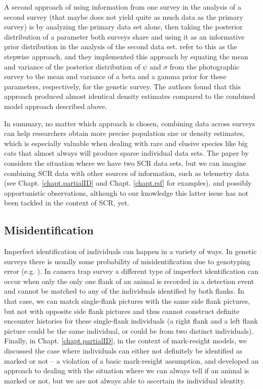 A second approach of using information from one survey in the analysis
of a second survey (that maybe does not yield quite as much data as
the primary survey) is by analyzing the 
primary data set alone, then
taking the posterior distribution of a parameter both surveys share
and using it as an informative prior distribution in the analysis of
the second data set. \citet{gopalaswamy_etal:2012mee} refer to this as
the stepwise approach, and they implemented this approach by equating
the mean and variance of the posterior distribution of $\psi$ and
$\sigma$ from the photographic survey to the mean and variance of a
beta and a gamma prior for these parameters, respectively, for the
genetic survey. The authors found that this approach produced almost
identical density estimates compared to the combined model approach
described above.

In summary, no matter which approach is chosen, combining data across
surveys can help researchers 
obtain more precise population size or density estimates, which is
especially valuable when dealing with rare and elusive species like
big cats that almost always will produce sparse individual data sets.
The paper by \citet{gopalaswamy_etal:2012mee} considers the situation
where we have two SCR data sets, but we can imagine combining SCR data
with other sources of information, such as telemetry data (see
Chapt. \ref{chapt.partialID} and Chapt. \ref{chapt.rsf} for examples),
and possibly opportunistic observations, although to our knowledge
this latter issue has not been tackled in the context of SCR, yet.


\subsection{Misidentification}

Imperfect identification of individuals can happen in a variety of
ways. In genetic surveys there is usually some probability of
misidentification due to genotyping error
(e.g. \citet{lukacs_burnham:2005}). In camera trap survey a different
type of imperfect identification can occur when only the only one
flank of an animal is recorded in a detection event and cannot be
matched to any of the individuals identified by both flanks.
In that case, we can match single-flank pictures with the same side
flank pictures, but not with opposite side flank pictures and thus
cannot construct definite encounter histories for these single-flank
individuals (a right flank and a left flank picture could be the same
individual, or could be from two distinct individuals). Finally, in
Chapt. \ref{chapt.partialID}, in the context of mark-resight models,
we discussed the case where individuals can either not definitely be
identified as marked or not -- a violation of a basic mark-resight
assumption, and developed an approach to dealing with the situation
where we can always tell if an animal is marked or not, but we are not
always able to ascertain its individual identity.

